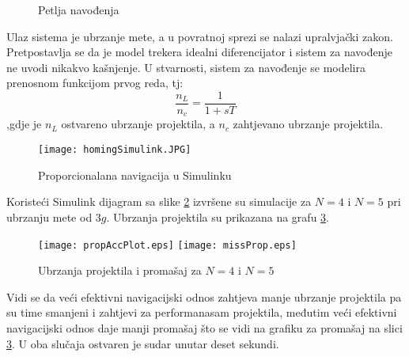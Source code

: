 \begin{figure}[htp]
    \centering
    \caption{Petlja navođenja}
    \label{fig:homing}
\end{figure}
Ulaz sistema je ubrzanje mete, a u 
povratnoj sprezi se nalazi upralvjački zakon. Pretpostavlja se da je model trekera idealni diferencijator i sistem 
za navođenje ne uvodi nikakvo kašnjenje. U stvarnosti, sistem za navođenje se modelira prenosnom 
funkcijom prvog reda, tj:
\begin{equation}
    \frac{n_L}{n_c}=\frac{1}{1+sT}
\end{equation}
,gdje je $n_L$ ostvareno ubrzanje projektila, a $n_c$ zahtjevano ubrzanje projektila.
\begin{figure}[h!]
    \texttt{[image: homingSimulink.JPG]}
    \caption{Proporcionalana navigacija u Simulinku}
    \label{fig:simProp}
\end{figure}
Koristeći Simulink dijagram sa slike \ref{fig:simProp} izvršene su simulacije za $N=4$ i $N=5$
pri ubrzanju mete od $3g$. Ubrzanja projektila su prikazana na grafu \ref{fig:propAcc}.
\begin{figure}[htp!]
    \centering
    \texttt{[image: propAccPlot.eps]}
    \texttt{[image: missProp.eps]}
    \caption{Ubrzanja projektila i promašaj za $N=4$ i $N=5$}
    \label{fig:propAcc}
\end{figure}
Vidi se da veći efektivni navigacijski odnos zahtjeva manje ubrzanje projektila pa su time 
smanjeni i zahtjevi za performanasam projektila, međutim veći efektivni navigacijski odnos 
daje manji promašaj što se vidi na grafiku za promašaj na slici \ref{fig:propAcc}. 
U oba slučaja ostvaren je sudar unutar deset sekundi. 
